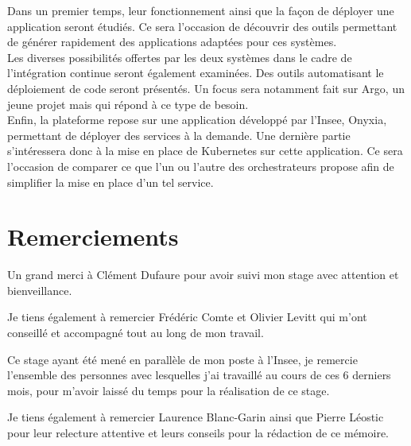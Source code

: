 \documentclass[11pt,fleqn]{book} %
\begin{document}
Dans un premier temps, leur fonctionnement ainsi que la façon de déployer une application seront étudiés. Ce sera l'occasion de découvrir des outils permettant de générer rapidement des applications adaptées pour ces systèmes.\\

Les diverses possibilités offertes par les deux systèmes dans le cadre de l'intégration continue seront également examinées. Des outils automatisant le déploiement de code seront présentés. Un focus sera notamment fait sur Argo, un jeune projet mais qui répond à ce type de besoin.\\

Enfin, la plateforme repose sur une application développé par l'Insee, Onyxia, permettant de déployer des services à la demande. Une dernière partie s'intéressera donc à la mise en place de Kubernetes sur cette application. Ce sera l'occasion de comparer ce que l'un ou l'autre des orchestrateurs propose afin de simplifier la mise en place d'un tel service.



\chapter*{Remerciements}
\vspace{-2cm}

Un grand merci à Clément Dufaure pour avoir suivi mon stage avec attention et bienveillance.\newline

Je tiens également à remercier Frédéric Comte et Olivier Levitt qui m’ont conseillé et accompagné tout au long de mon travail.  \newline

Ce stage ayant été mené en parallèle de mon poste à l’Insee, je remercie l'ensemble des personnes avec lesquelles j'ai travaillé au cours de ces 6 derniers mois, pour m'avoir laissé du temps pour la réalisation de ce stage.\newline

Je tiens également à remercier Laurence Blanc-Garin ainsi que Pierre Léostic pour leur relecture attentive et leurs conseils pour la rédaction de ce mémoire. 



\vspace{-3cm}
\tableofcontents %
\cleardoublepage %
\end{document}
